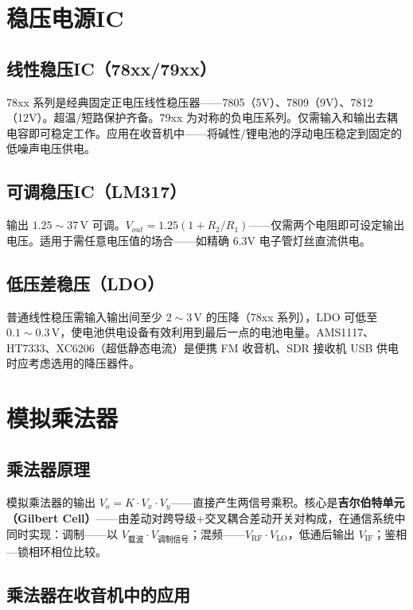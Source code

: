\documentclass[12pt,UTF8]{ctexbook}
\begin{document}
\section{稳压电源IC}
\label{sec:voltage_regulator_ic}

\subsection{线性稳压IC（78xx/79xx）}

78xx 系列是经典固定正电压线性稳压器——7805（5V）、7809（9V）、7812（12V）。超温/短路保护齐备。79xx 为对称的负电压系列。仅需输入和输出去耦电容即可稳定工作。应用在收音机中——将碱性/锂电池的浮动电压稳定到固定的低噪声电压供电。

\subsection{可调稳压IC（LM317）}

输出 $1.25\sim37\,\mathrm{V}$ 可调。$V_{out}=1.25(1+R_2/R_1)$——仅需两个电阻即可设定输出电压。适用于需任意电压值的场合——如精确 6.3V 电子管灯丝直流供电。

\subsection{低压差稳压（LDO）}

普通线性稳压需输入输出间至少 $2\sim3\,\mathrm{V}$ 的压降（78xx 系列），LDO 可低至 $0.1\sim0.3\,\mathrm{V}$，使电池供电设备有效利用到最后一点的电池电量。AMS1117、HT7333、XC6206（超低静态电流）是便携 FM 收音机、SDR 接收机 USB 供电时应考虑选用的降压器件。

\section{模拟乘法器}
\label{sec:analog_multiplier}

\subsection{乘法器原理}

模拟乘法器的输出 $V_o = K \cdot V_x \cdot V_y$——直接产生两信号乘积。核心是\textbf{吉尔伯特单元（Gilbert Cell）}——由差动对跨导级+交叉耦合差动开关对构成，在通信系统中同时实现：调制——以 $V_{\text{载波}} \cdot V_{\text{调制信号}}$；混频——$V_{\text{RF}} \cdot V_{\text{LO}}$，低通后输出 $V_{\text{IF}}$；鉴相—锁相环相位比较。

\subsection{乘法器在收音机中的应用}
\end{document}
